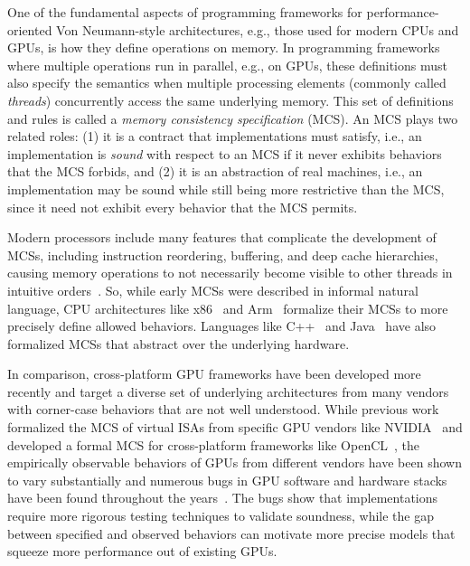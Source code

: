 One of the fundamental aspects of programming frameworks for performance-oriented Von Neumann-style architectures, e.g., those used for modern CPUs and GPUs, is how they define operations on memory. In programming frameworks where multiple operations run in parallel, e.g., on GPUs, these definitions must also specify the semantics when multiple processing elements (commonly called \textit{threads}) concurrently access the same underlying memory. This set of definitions and rules is called a \textit{memory consistency specification} (MCS). An MCS plays two related roles: (1) it is a contract that implementations must satisfy, i.e., an implementation is \textit{sound} with respect to an MCS if it never exhibits behaviors that the MCS forbids, and (2) it is an abstraction of real machines, i.e., an implementation may be sound while still being more restrictive than the MCS, since it need not exhibit every behavior that the MCS permits.

Modern processors include many features that complicate the development of MCSs, including instruction reordering, buffering, and deep cache hierarchies, causing memory operations to not necessarily become visible to other threads in intuitive orders~\cite{nagarajan2020primer,gharachorloo1991performance,sarkar2011understanding,sarkar2009semantics}. So, while early MCSs were described in informal natural language, CPU architectures like x86~\cite{owens2009x86} and Arm~\cite{alglave2009semantics} formalize their MCSs to more precisely define allowed behaviors. Languages like C++~\cite{batty2011mathematizing} and Java~\cite{manson2005java} have also formalized MCSs that abstract over the underlying hardware.

In comparison, cross-platform GPU frameworks have been developed more recently and target a diverse set of underlying architectures from many vendors with corner-case behaviors that are not well understood. While previous work formalized the MCS of virtual ISAs from specific GPU vendors like NVIDIA~\cite{lustig2019ptx} and developed a formal MCS for cross-platform frameworks like OpenCL~\cite{batty2016overhauling}, the empirically observable behaviors of GPUs from different vendors have been shown to vary substantially and numerous bugs in GPU software and hardware stacks have been found throughout the years~\cite{alglave2015gpu,alglave2010fences,kirkham2020foundations}. The bugs show that implementations require more rigorous testing techniques to validate soundness, while the gap between specified and observed behaviors can motivate more precise models that squeeze more performance out of existing GPUs.

